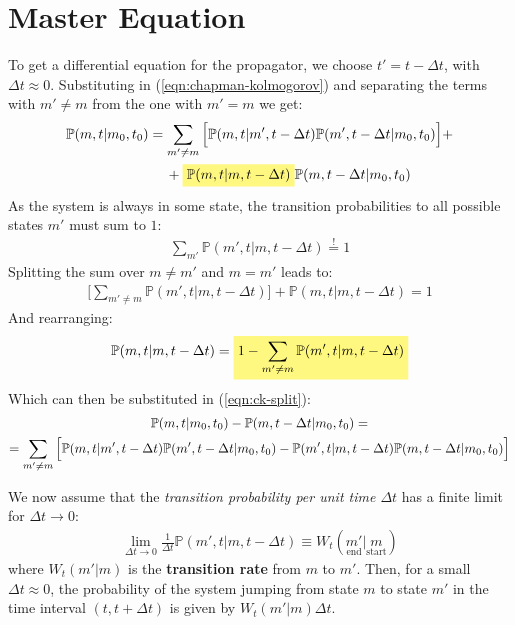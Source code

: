 \documentclass[../../main.tex]{subfiles}
\begin{document}
\section{Master Equation}

To get a differential equation for the propagator, we choose $t' = t - \Delta t$, with $\Delta t \approx 0$. Substituting in (\ref{eqn:chapman-kolmogorov}) and separating the terms with $m' \neq m$ from the one with $m' = m$ we get:
\begin{align}\nonumber
    \mathbb{P}(m,t|m_0,t_0) &= \sum_{m' \neq m} \Big[\mathbb{P}(m,t|m',t-\Delta t) \mathbb{P}(m', t-\Delta t|m_0,t_0)\Big] +\\
    &\quad\> +\hlc{Yellow}{ \mathbb{P}(m,t|m,t-\Delta t)}\mathbb{P}(m,t-\Delta t|m_0,t_0) \label{eqn:ck-split}
\end{align}
As the system is always in some state, the transition probabilities to all possible states $m'$ must sum to $1$:
\begin{align*}
    \sum_{m'} \mathbb{P}(m',t|m,t-\Delta t) \overset{!}{=}  1
\end{align*}
Splitting the sum over $m \neq m'$ and $m = m'$ leads to:
\begin{align*}
    \Big[\sum_{m' \neq m} \mathbb{P}(m',t|m,t-\Delta t)\Big] + \mathbb{P}(m,t|m,t-\Delta t) = 1
\end{align*}
And rearranging:
\begin{align*}
    \mathbb{P}(m,t|m,t-\Delta t) = \hlc{Yellow}{1- \sum_{m' \neq m} \mathbb{P}(m',t|m,t-\Delta t)}
\end{align*}
Which can then be substituted in (\ref{eqn:ck-split}):
\begin{align}\label{eqn:ck-2}
    \mathbb{P}(m,t|m_0,t_0) - \mathbb{P}(m, t-\Delta t|m_0,t_0) = \span\\ \nonumber
    = \sum_{m' \neq m} \Big[\mathbb{P}(m,t|m',t-\Delta t) \mathbb{P}(m',t- \Delta t|m_0,t_0) - \mathbb{P}(m',t|m,t-\Delta t) \mathbb{P}(m,t-\Delta t|m_0,t_0)\Big] \span
\end{align}

We now assume that the \textit{transition probability per unit time $\Delta t$} has a finite limit for $\Delta t \to 0$:
\begin{align*}
    \lim_{\Delta t \to 0} \frac{1}{\Delta t} \mathbb{P}(m',t|m,t-\Delta t) \equiv W_t(\underset{\mathrm{end}}{m'} |\underset{\mathrm{start}}{m} )
\end{align*}   
where $W_t(m'|m)$ is the \textbf{transition rate} from $m$ to $m'$. Then, for a small $\Delta t \approx 0$, the probability of the system jumping from state $m$ to state $m'$ in the time interval $(t,t+\Delta t)$ is given by $W_t(m'|m) \Delta t$.  
\end{document}

